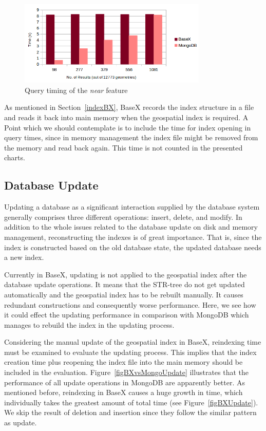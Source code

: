 \documentclass[a4paper,12pt]{article}
\begin{document}


\begin{figure}
\centering
\includegraphics[width=0.8\textwidth]{BXvsMongoNear-newColor.png}
\caption{Query timing of the \textit{near} feature}
\label{figBXvsMongoNear}
\end{figure}


As mentioned in Section~\ref{indexBX}, BaseX records the index structure in a file and reads it back into main memory when the geospatial index is required. A Point which we should contemplate is to include the time for index opening in query times, since in memory management the index file might be removed from the memory and read back again. This time is not counted in the presented charts.


\subsection{Database Update}
\label{update}
Updating a database as a significant interaction supplied by the database system generally comprises three different operations: insert, delete, and modify. In addition to the whole issues related to the database update on disk and memory management, reconstructing the indexes is of great importance. That is, since the index is constructed based on the old database state, the updated database needs a new index. %

Currently in BaseX, updating is not applied to the geospatial index after the database update operations. It means that the STR-tree do not get updated automatically and the geospatial index has to be rebuilt manually. It causes redundant constructions and consequently worse performance. Here, we see how it could effect the updating performance in comparison with MongoDB which manages to rebuild the index in the updating process.

Considering the manual update of the geospatial index in BaseX, reindexing time must be examined to evaluate the updating process. This implies that the index creation time plus reopening the index file into the main memory should be included in the evaluation. 
Figure~\ref{figBXvsMongoUpdate} illustrates that the performance of all update operations in MongoDB are apparently better. As mentioned before, reindexing in BaseX causes a huge growth in time, which individually takes the greatest amount of total time (see Figure~\ref{figBXUpdate}). We skip the result of deletion and insertion since they follow the similar pattern as update.
\end{document}

